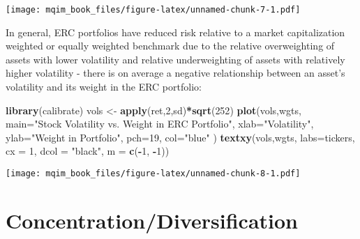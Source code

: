\documentclass[]{book}
\newenvironment{Shaded}{\begin{snugshade}}{\end{snugshade}}
\newcommand{\KeywordTok}[1]{\textcolor[rgb]{0.13,0.29,0.53}{\textbf{#1}}}
\newcommand{\DataTypeTok}[1]{\textcolor[rgb]{0.13,0.29,0.53}{#1}}
\newcommand{\DecValTok}[1]{\textcolor[rgb]{0.00,0.00,0.81}{#1}}
\newcommand{\StringTok}[1]{\textcolor[rgb]{0.31,0.60,0.02}{#1}}
\newcommand{\OperatorTok}[1]{\textcolor[rgb]{0.81,0.36,0.00}{\textbf{#1}}}
\newcommand{\NormalTok}[1]{#1}
\theoremstyle{definition}
\theoremstyle{definition}
\theoremstyle{definition}
\theoremstyle{remark}
\begin{document}
\begin{Shaded}
\end{Shaded}

\texttt{[image: mqim\_book\_files/figure-latex/unnamed-chunk-7-1.pdf]}

In general, ERC portfolios have reduced risk relative to a market
capitalization weighted or equally weighted benchmark due to the
relative overweighting of assets with lower volatility and relative
underweighting of assets with relatively higher volatility - there is on
average a negative relationship between an asset's volatility and its
weight in the ERC portfolio:

\begin{Shaded}
\begin{Highlighting}[]
\KeywordTok{library}\NormalTok{(calibrate)}
\NormalTok{vols <-}\StringTok{ }\KeywordTok{apply}\NormalTok{(ret,}\DecValTok{2}\NormalTok{,sd)}\OperatorTok{*}\KeywordTok{sqrt}\NormalTok{(}\DecValTok{252}\NormalTok{)}
\KeywordTok{plot}\NormalTok{(vols,wgts,}
     \DataTypeTok{main=}\StringTok{"Stock Volatility vs. Weight in ERC Portfolio"}\NormalTok{,}
     \DataTypeTok{xlab=}\StringTok{"Volatility"}\NormalTok{,}
     \DataTypeTok{ylab=}\StringTok{"Weight in Portfolio"}\NormalTok{,}
     \DataTypeTok{pch=}\DecValTok{19}\NormalTok{,}
     \DataTypeTok{col=}\StringTok{"blue"}
\NormalTok{     )}
\KeywordTok{textxy}\NormalTok{(vols,wgts, }\DataTypeTok{labs=}\NormalTok{tickers, }\DataTypeTok{cx =} \DecValTok{1}\NormalTok{, }\DataTypeTok{dcol =} \StringTok{"black"}\NormalTok{, }\DataTypeTok{m =} \KeywordTok{c}\NormalTok{(}\OperatorTok{-}\DecValTok{1}\NormalTok{, }\OperatorTok{-}\DecValTok{1}\NormalTok{))}
\end{Highlighting}
\end{Shaded}

\texttt{[image: mqim\_book\_files/figure-latex/unnamed-chunk-8-1.pdf]}

\section{Concentration/Diversification}\label{concentrationdiversification}
\end{document}
